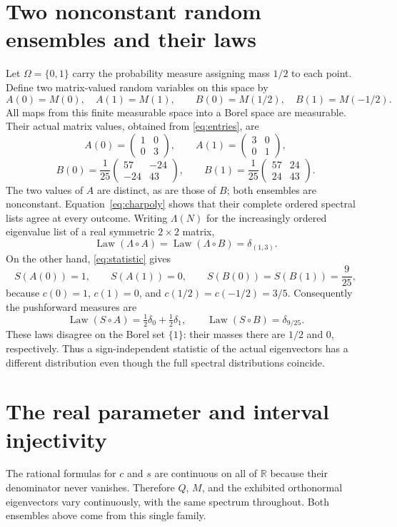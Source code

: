 \documentclass[10pt]{article}
\newcommand{\R}{\mathbb R}
\newcommand{\Law}{\operatorname{Law}}
\begin{document}
\section{Two nonconstant random ensembles and their laws}
Let $\Omega=\{0,1\}$ carry the probability measure assigning mass $1/2$ to each point. Define two matrix-valued random variables on this space by
\[
 A(0)=M(0),\quad A(1)=M(1),\qquad
 B(0)=M(1/2),\quad B(1)=M(-1/2).
\]
All maps from this finite measurable space into a Borel space are measurable. Their actual matrix values, obtained from \eqref{eq:entries}, are
\[
 A(0)=\begin{pmatrix}1&0\\0&3\end{pmatrix},\qquad
 A(1)=\begin{pmatrix}3&0\\0&1\end{pmatrix},
\]
\[
 B(0)=\frac1{25}\begin{pmatrix}57&-24\\-24&43\end{pmatrix},\qquad
 B(1)=\frac1{25}\begin{pmatrix}57&24\\24&43\end{pmatrix}.
\]
The two values of $A$ are distinct, as are those of $B$; both ensembles are nonconstant. Equation~\eqref{eq:charpoly} shows that their complete ordered spectral lists agree at every outcome. Writing $\Lambda(N)$ for the increasingly ordered eigenvalue list of a real symmetric $2\times2$ matrix,
\[
 \Law(\Lambda\circ A)=\Law(\Lambda\circ B)=\delta_{(1,3)}.
\]
On the other hand, \eqref{eq:statistic} gives
\[
 S(A(0))=1,\qquad S(A(1))=0,\qquad
 S(B(0))=S(B(1))=\frac9{25},
\]
because $c(0)=1$, $c(1)=0$, and $c(1/2)=c(-1/2)=3/5$. Consequently the pushforward measures are
\begin{equation}\label{eq:laws}
 \Law(S\circ A)=\tfrac12\delta_0+\tfrac12\delta_1,
 \qquad \Law(S\circ B)=\delta_{9/25}.
\end{equation}
These laws disagree on the Borel set $\{1\}$: their masses there are $1/2$ and $0$, respectively. Thus a sign-independent statistic of the actual eigenvectors has a different distribution even though the full spectral distributions coincide.

\clearpage
\section{The real parameter and interval injectivity}
The rational formulas for $c$ and $s$ are continuous on all of $\R$ because their denominator never vanishes. Therefore $Q$, $M$, and the exhibited orthonormal eigenvectors vary continuously, with the same spectrum throughout. Both ensembles above come from this single family.
\end{document}
